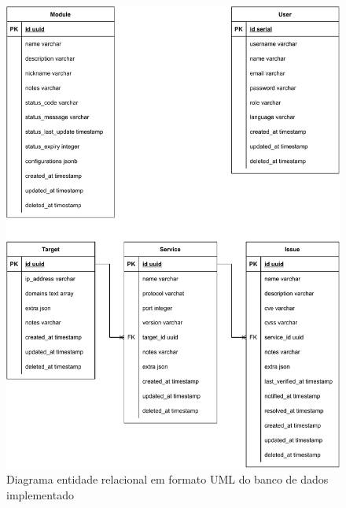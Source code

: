     \begin{figure}[H]
        \includegraphics[scale=0.7]{figuras/vumos-db-api-uml.pdf}
        \caption{Diagrama entidade relacional em formato UML do banco de dados implementado \label{fig:vumos-db-uml}}
    \end{figure}
    
